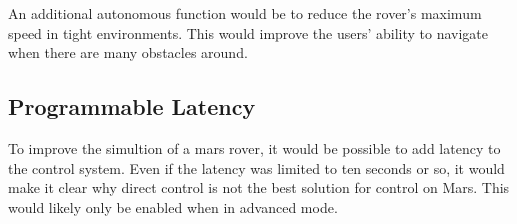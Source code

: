 \documentclass[letterpaper,10pt]{article}
\begin{document}
    An additional autonomous function would be to reduce the rover's maximum speed in tight environments.  This would improve the users' ability to navigate when there are many obstacles around.
    
  \subsection{Programmable Latency}
    To improve the simultion of a mars rover, it would be possible to add latency to the control system.  Even if the latency was limited to ten seconds or so, it would make it clear why direct control is not the best solution for control on Mars.  This would likely only be enabled when in advanced mode.
\end{document}
